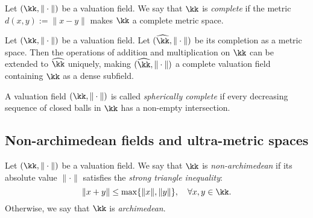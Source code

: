     \begin{definition}\label{def:complete_valuation_field}
        Let \((\kk,\|\cdot\|)\) be a valuation field.
        We say that \(\kk\) is \emph{complete} if the metric \(d(x,y) := \|x - y\|\) makes \(\kk\) a complete metric space.
    \end{definition}

    \begin{lemma}\label{lem:completion_of_valuation_field}
        Let \((\kk,\|\cdot\|)\) be a valuation field.
        Let \((\widehat{\kk},\|\cdot\|)\) be its completion as a metric space.
        Then the operations of addition and multiplication on \(\kk\) can be extended to \(\widehat{\kk}\) uniquely, making \((\widehat{\kk},\|\cdot\|)\) a complete valuation field containing \(\kk\) as a dense subfield.
    \end{lemma}


    \begin{definition}\label{def:spherically_complete}
        A valuation field \((\kk,\|\cdot\|)\) is called \emph{spherically complete} if every decreasing sequence of closed balls in \(\kk\) has a non-empty intersection.
    \end{definition}

\subsection{Non-archimedean fields and ultra-metric spaces}

    \begin{definition}\label{def:non-archimedean_fields}
        Let \((\kk,\|\cdot\|)\) be a valuation field.
        We say that \(\kk\) is \emph{non-archimedean} if its absolute value \(\|\cdot\|\) satisfies the \emph{strong triangle inequality}:
        \[ \|x+y\|\leq\max\{\|x\|,\|y\|\},\quad\forall x,y\in\kk. \]
        Otherwise, we say that \(\kk\) is \emph{archimedean}.
    \end{definition}

